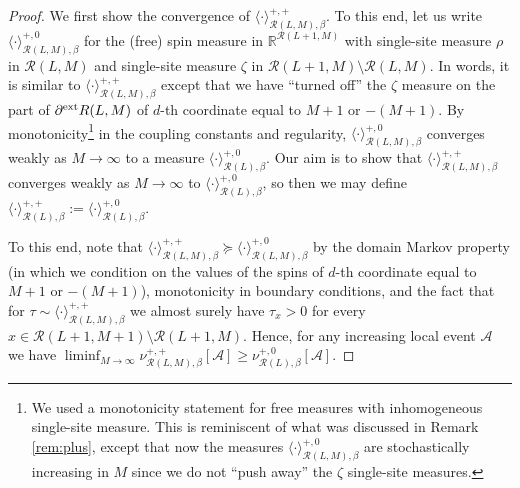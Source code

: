 \documentclass[11pt,a4paper]{article}
\numberwithin{equation}{section}
\theoremstyle{plain}
\theoremstyle{definition}
\begin{document}
\begin{proof} 
We first show the convergence of $\langle \cdot \rangle^{+,+}_{\mathcal{R}(L,M),\beta}$. To this end, let us write $\langle \cdot \rangle^{+,0}_{\mathcal{R}(L,M),\beta}$ for the (free) spin measure in $\mathbb{R}^{\mathcal{R}(L+1,M)}$ with single-site measure $\rho$ in $\mathcal{R}(L,M)$ and single-site measure $\zeta$ in $\mathcal{R}(L+1,M)\setminus \mathcal{R}(L,M)$. In words, it is similar to $\langle \cdot \rangle^{+,+}_{\mathcal{R}(L,M),\beta}$ except that we have ``turned off'' the $\zeta$ measure on the part of $\partial^{\textup{ext}}R(L,M)$ of $d$-th coordinate equal to $M+1$ or $-(M+1)$.
By monotonicity\footnote{We used a monotonicity statement for free measures with inhomogeneous single-site measure. This is reminiscent of what was discussed in Remark \ref{rem:plus}, except that now the measures $\langle \cdot \rangle^{+,0}_{\mathcal{R}(L,M),\beta}$ are stochastically increasing in $M$ since we do not ``push away'' the $\zeta$ single-site measures.} in the coupling constants and regularity, $\langle \cdot \rangle^{+,0}_{\mathcal{R}(L,M),\beta}$ converges weakly as $M\to\infty$ to a measure $\langle \cdot \rangle^{+,0}_{\mathcal{R}(L),\beta}$. Our aim is to show that $\langle \cdot \rangle^{+,+}_{\mathcal{R}(L,M),\beta}$ converges weakly as $M\to\infty$ to $\langle \cdot \rangle^{+,0}_{\mathcal{R}(L),\beta}$, so then we may define $\langle \cdot \rangle^{+,+}_{\mathcal R(L),\beta}:=\langle \cdot \rangle^{+,0}_{\mathcal R(L),\beta}$.

To this end, note that $\langle \cdot \rangle^{+,+}_{\mathcal{R}(L,M),\beta} \succcurlyeq \langle \cdot \rangle^{+,0}_{\mathcal{R}(L,M),\beta}$ by the domain Markov property (in which we condition on the values of the spins of $d$-th coordinate equal to $M+1$ or $-(M+1)$), monotonicity in boundary conditions, and the fact that for $\tau \sim \langle \cdot \rangle^{+,+}_{\mathcal{R}(L,M),\beta}$ we almost surely have $\tau_x>0$ for every $x\in \mathcal{R}(L+1,M+1)\setminus \mathcal{R}(L+1,M)$. Hence, for any increasing local event $\mathcal{A}$ we have $\liminf_{M\to\infty}\nu^{+,+}_{\mathcal{R}(L,M),\beta}[\mathcal{A}]\geq \nu^{+,0}_{\mathcal{R}(L),\beta}[\mathcal{A}]$. 


\end{proof}
\end{document}
